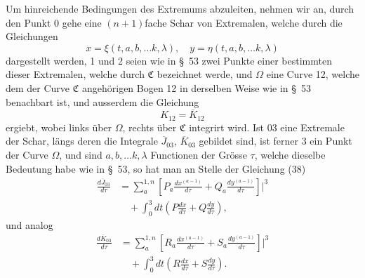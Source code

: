\documentclass[11pt,a4paper,leqno]{article}
\begin{document}
Um hinreichende Bedingungen des Extremums abzuleiten, nehmen wir an, durch den Punkt 0 gehe eine $(n+1)$fache Schar von Extremalen, welche durch die Gleichungen
\[
x=\xi(t,a,b,\ldots k,\lambda),\quad
y=\eta(t,a,b,\ldots k,\lambda)
\]
dargestellt werden, 1 und 2 seien wie in \S~53 zwei Punkte einer bestimmten dieser Extremalen, welche durch $\mathfrak{C}$ bezeichnet werde, und $\Omega$ eine Curve 12, welche dem der Curve $\mathfrak{C}$ angehörigen Bogen 12 in derselben Weise wie in \S~53 benachbart ist, und ausserdem die Gleichung
\begin{equation}\tag{45}
K_{12}=\overline{K}_{12}
\end{equation}
ergiebt, wobei links über $\Omega$, rechts über $\mathfrak{C}$ integrirt wird. Ist 03 eine Extremale der Schar, längs deren die Integrale $\overline{J}_{03}$, $\overline{K}_{03}$ gebildet sind, ist ferner 3 ein Punkt der Curve $\Omega$, und sind $a,b,\ldots k,\lambda$ Functionen der Grösse $\tau$, welche dieselbe Bedeutung habe wie in \S~53, so hat man an Stelle der Gleichung (38)
\begin{equation}\tag{46}
\begin{aligned}
\frac{d\overline{J}_{03}}{d\tau}
&=\sum_a^{1,n}\left[P_a\frac{dx^{(a-1)}}{d\tau}
+Q_a\frac{dy^{(a-1)}}{d\tau}\right]\bigg|^3\\
&\quad+\int_0^3dt\left(P\frac{dx}{d\tau}+Q\frac{dy}{d\tau}\right),
\end{aligned}
\end{equation}
und analog
\begin{equation}\tag{47}
\begin{aligned}
\frac{d\overline{K}_{03}}{d\tau}
&=\sum_a^{1,n}\left[R_a\frac{dx^{(a-1)}}{d\tau}
+S_a\frac{dy^{(a-1)}}{d\tau}\right]\bigg|^3\\
&\quad+\int_0^3dt\left(R\frac{dx}{d\tau}+S\frac{dy}{d\tau}\right).
\end{aligned}
\end{equation}
\end{document}
